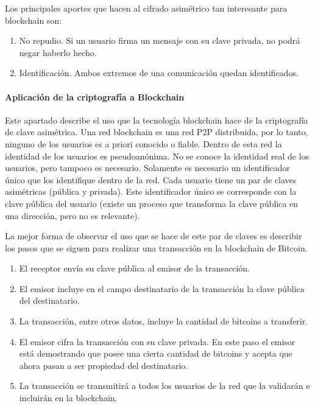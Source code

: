 Los principales aportes que hacen al cifrado asimétrico tan interesante para blockchain son:

\begin{enumerate}
	\item No repudio. Si un usuario firma un mensaje con su clave privada, no podrá negar haberlo hecho.
	\item Identificación. Ambos extremos de una comunicación quedan identificados.
\end{enumerate}

\paragraph{Aplicación de la criptografía a Blockchain}

Este apartado describe el uso que la tecnología blockchain hace de la criptografía de clave asimétrica. Una red blockchain es una red P2P distribuida, por lo tanto, ninguno de los usuarios es a priori conocido o fiable. Dentro de esta red la identidad de los usuarios es pseudoanónima. No se conoce la identidad real de los usuarios, pero tampoco es necesario. Solamente es necesario un identificador único que los identifique dentro de la red. Cada usuario tiene un par de claves asimétricas (pública y privada). Este identificador único se corresponde con la clave pública del usuario (existe un proceso que transforma la clave pública en una dirección, pero no es relevante). \newline

La mejor forma de observar el uso que se hace de este par de claves es describir los pasos que se siguen para realizar una transacción en la blockchain de Bitcoin.

\begin{enumerate}
	\item El receptor envía su clave pública al emisor de la transacción.
	\item El emisor incluye en el campo destinatario de la transacción la clave pública del destinatario.
	\item La transacción, entre otros datos, incluye la cantidad de bitcoins a transferir.
	\item El emisor cifra la transacción con su clave privada. En este paso el emisor está demostrando que posee una cierta cantidad de bitcoins y acepta que ahora pasan a ser propiedad del destinatario.
	\item La transacción se transmitirá a todos los usuarios de la red que la validarán e incluirán en la blockchain.
\end{enumerate}

